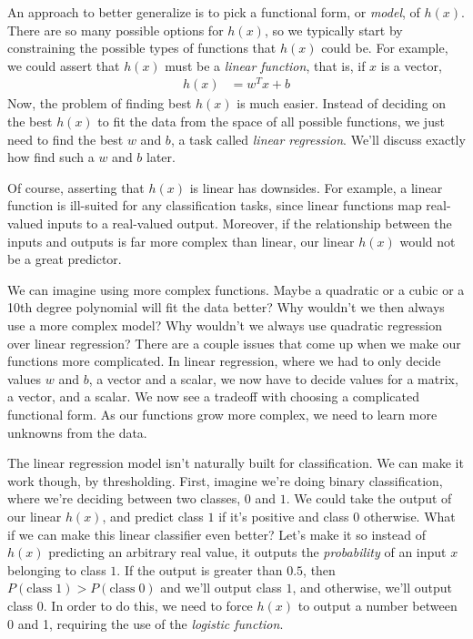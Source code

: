 \documentclass[a4paper,10pt]{article}
\begin{document}
An approach to better generalize 
is to pick a functional form, or \emph{model},
of $h(x)$. 
There are so many possible options for $h(x)$,
so we typically start by constraining the
possible types of functions that $h(x)$ could be.
For example, we could assert that $h(x)$ must be
a \emph{linear function}, that is,
if $x$ is a vector,
\begin{align}
  h(x) &= w^Tx + b
\end{align}
Now, the problem of finding 
best $h(x)$ is much easier.
Instead of deciding on the best $h(x)$
to fit the data from the space of all possible
functions, we just need to
find the best $w$ and $b$,
a task called \emph{linear regression}.
We'll discuss exactly how find such a $w$ and $b$ later.

Of course, asserting that $h(x)$
is linear has downsides.
For example, a linear function is ill-suited
for any classification tasks,
since linear functions map real-valued inputs
to a real-valued output.
Moreover, if the relationship
between the inputs and outputs
is far more complex than linear,
our linear $h(x)$ would not be a great predictor.


We can imagine using more complex functions.
Maybe a quadratic or a cubic
or a 10th degree polynomial
will fit the data better?
Why wouldn't we then always use
a more complex model?
Why wouldn't we always use quadratic regression
over linear regression? There are a couple
issues that come up when we make our functions more complicated.
In linear regression, where we had to
only decide values $w$ and $b$, a vector
and a scalar, we now have to decide
values for a matrix, a vector,
and a scalar. We now see a tradeoff
with choosing a complicated functional form.
As our functions grow more complex,
we need to learn more unknowns from the data.

The linear regression model isn't
naturally built for classification.
We can make it work though,
by thresholding.
First, imagine we're doing
binary classification,
where we're deciding between two
classes, $0$ and $1$.
We could take the output of our linear $h(x)$,
and predict class $1$ if it's positive
and class $0$ otherwise.
What if we can make this linear classifier
even better? Let's make it so instead of
$h(x)$ predicting an arbitrary real value,
it outputs
the \emph{probability} of an input $x$
belonging to class $1$.
If the output is greater than $0.5$,
then $P(\text{class}\; 1) > P(\text{class}\; 0)$
and we'll output class $1$,
and otherwise, we'll output class $0$.
In order to do this, we need to force
$h(x)$ to output a number between 0 and 1,
requiring the use of the \emph{logistic function}.
\end{document}
